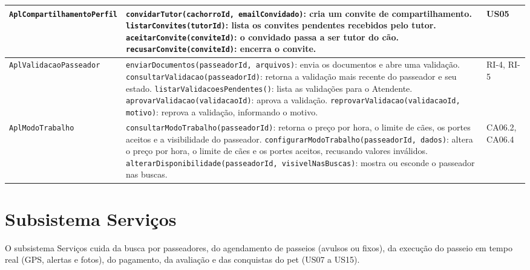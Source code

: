 \begin{footnotesize}
\begin{longtable}{|p{3.4cm}|p{7.6cm}|p{2.4cm}|}
	\texttt{AplCompartilhamentoPerfil} & \texttt{convidarTutor(cachorroId, emailConvidado)}: cria um convite de compartilhamento. \newline
	\texttt{listarConvites(tutorId)}: lista os convites pendentes recebidos pelo tutor. \newline
	\texttt{aceitarConvite(conviteId)}: o convidado passa a ser tutor do cão. \newline
	\texttt{recusarConvite(conviteId)}: encerra o convite. & US05 \\\hline

	\texttt{AplValidacaoPasseador} & \texttt{enviarDocumentos(passeadorId, arquivos)}: envia os documentos e abre uma validação. \newline
	\texttt{consultarValidacao(passeadorId)}: retorna a validação mais recente do passeador e seu estado. \newline
	\texttt{listarValidacoesPendentes()}: lista as validações para o Atendente. \newline
	\texttt{aprovarValidacao(validacaoId)}: aprova a validação. \newline
	\texttt{reprovarValidacao(validacaoId, motivo)}: reprova a validação, informando o motivo. & RI-4, RI-5 \\\hline

	\texttt{AplModoTrabalho} & \texttt{consultarModoTrabalho(passeadorId)}: retorna o preço por hora, o limite de cães, os portes aceitos e a visibilidade do passeador. \newline
	\texttt{configurarModoTrabalho(passeadorId, dados)}: altera o preço por hora, o limite de cães e os portes aceitos, recusando valores inválidos. \newline
	\texttt{alterarDisponibilidade(passeadorId, visivelNasBuscas)}: mostra ou esconde o passeador nas buscas. & CA06.2, CA06.4 \\\hline
\end{longtable}
\end{footnotesize}



\section{Subsistema Serviços}
\label{sec-logica-servicos}

O subsistema Serviços cuida da busca por passeadores, do agendamento de passeios (avulsos ou fixos), da execução do passeio em tempo real (GPS, alertas e fotos), do pagamento, da avaliação e das conquistas do pet (US07 a US15).


